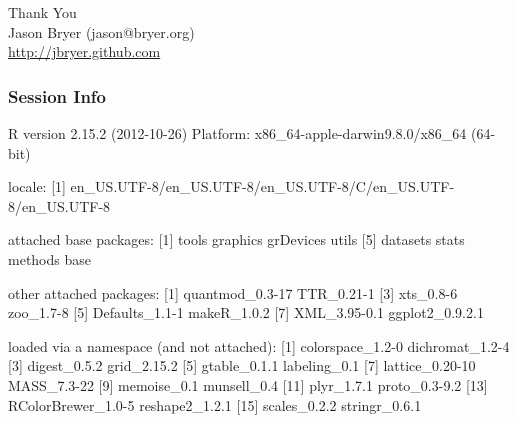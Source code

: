 \documentclass[10pt,slidestop,mathserif,c]{beamer}
\begin{document}
\begin{frame}[c]
	\LARGE{Thank You}\\
	\normalsize
	Jason Bryer (jason@bryer.org)\\
	\url{http://jbryer.github.com}
\end{frame}

\begin{frame}[fragile,containsverbatim,shrink=5]
	\frametitle{Session Info}
\begin{Schunk}
\begin{Soutput}
R version 2.15.2 (2012-10-26)
Platform: x86_64-apple-darwin9.8.0/x86_64 (64-bit)

locale:
[1] en_US.UTF-8/en_US.UTF-8/en_US.UTF-8/C/en_US.UTF-8/en_US.UTF-8

attached base packages:
[1] tools     graphics  grDevices utils    
[5] datasets  stats     methods   base     

other attached packages:
[1] quantmod_0.3-17 TTR_0.21-1     
[3] xts_0.8-6       zoo_1.7-8      
[5] Defaults_1.1-1  makeR_1.0.2    
[7] XML_3.95-0.1    ggplot2_0.9.2.1

loaded via a namespace (and not attached):
 [1] colorspace_1.2-0   dichromat_1.2-4   
 [3] digest_0.5.2       grid_2.15.2       
 [5] gtable_0.1.1       labeling_0.1      
 [7] lattice_0.20-10    MASS_7.3-22       
 [9] memoise_0.1        munsell_0.4       
[11] plyr_1.7.1         proto_0.3-9.2     
[13] RColorBrewer_1.0-5 reshape2_1.2.1    
[15] scales_0.2.2       stringr_0.6.1     
\end{Soutput}
\end{Schunk}
\end{frame}
\end{document}
